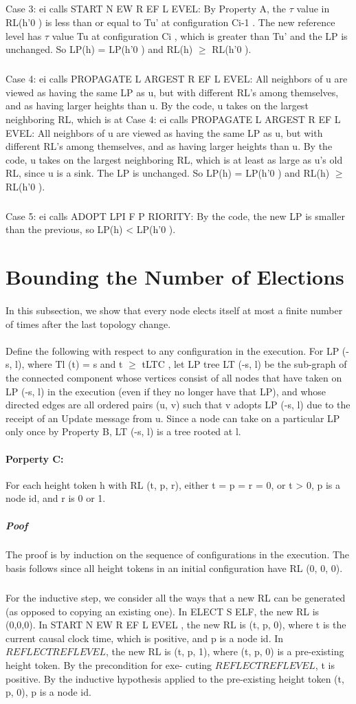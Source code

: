 \subparagraph{}Case 3: ei calls START N EW R EF L EVEL: By Property A, the $\tau$ value in RL(h'0 ) is less than or equal to Tu' at configuration Ci-1 . The new reference level has $\tau$ value Tu at configuration Ci , which is greater than Tu' and the LP is unchanged. So LP(h) = LP(h'0 ) and RL(h) $\geq$ RL(h'0 ).
\subparagraph{}Case 4: ei calls PROPAGATE L ARGEST R EF L EVEL: All neighbors of u are viewed as having the same LP as u, but with different RL's among themselves, and as having larger heights than u. By the code, u takes on the largest neighboring RL, which is at Case 4: ei calls PROPAGATE L ARGEST R EF L EVEL: All neighbors of u are viewed as having the same LP as u, but with different RL's among themselves, and as having larger heights than u. By the code, u takes on the largest neighboring RL, which is at least as large as u's old RL, since u is a sink. The LP is unchanged. So LP(h) = LP(h'0 ) and RL(h) $\geq$ RL(h'0 ).
\subparagraph{}Case 5: ei calls ADOPT LPI F P RIORITY: By the code, the new LP is smaller than the previous, so LP(h) < LP(h'0 ).
\section{Bounding the Number of Elections}
\paragraph{}In this subsection, we show that every node elects itself at most a finite number of times after the last topology change.
\paragraph{}Define the following with respect to any configuration in the execution. For LP (-s, l), where Tl (t) = s and t $\geq$ tLTC , let LP tree LT (-s, l) be the sub-graph of the connected component whose vertices consist of all nodes that have taken on LP (-s, l) in the execution (even if they no longer have that LP), and whose directed edges are all ordered pairs (u, v) such that v adopts LP (-s, l) due to the receipt of an Update message from u. Since a node can take on a particular LP only once by Property B, LT (-s, l) is a tree rooted at l.
\paragraph{Porperty C:}For each height token h with RL (t, p, r), either t = p = r = 0, or t > 0, p is a node id, and r is 0 or 1.
\subparagraph{Poof}The proof is by induction on the sequence of configurations in the execution. The basis follows since all height tokens in an initial configuration have RL (0, 0, 0).
\subparagraph{}For the inductive step, we consider all the ways that a new RL can be generated (as opposed to copying an existing one). In ELECT S ELF, the new RL is (0,0,0). In START N EW R EF L EVEL , the new RL is (t, p, 0), where t is the current causal clock time, which is positive, and p is a node id. In $REFLECTREFLEVEL$, the new RL is (t, p, 1), where (t, p, 0) is a pre-existing height token. By the precondition for exe- cuting $REFLECTREFLEVEL$, t is positive. By the inductive hypothesis applied to the pre-existing height token (t, p, 0), p is a node id.
